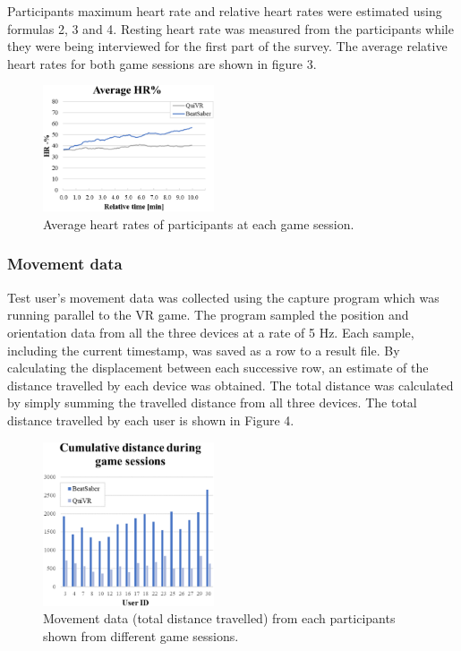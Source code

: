 \documentclass{sig-alternate-05-2015}
\begin{document}
Participants maximum heart rate and relative heart rates were estimated using 
formulas 2, 3 and 4. Resting heart rate was measured from the participants while 
they were being interviewed for the first part of the survey. The average relative 
heart rates for both game sessions are shown in figure 3.  

\begin{figure}
    \centering
    \includegraphics[width=0.45\textwidth]{heartrate}
    \caption
        {
            Average heart rates of participants at each game session.
        }
\end{figure}

\subsubsection{Movement data}

Test user’s movement data was collected using the capture program which was running 
parallel to the VR game. The program sampled the position and orientation data from 
all the three devices at a rate of 5 Hz. Each sample, including the current timestamp, 
was saved as a row to a result file. By calculating the displacement between each 
successive row, an estimate of the distance travelled by each device was obtained. 
The total distance was calculated by simply summing the travelled distance from all 
three devices. The total distance travelled by each user is shown in Figure 4. 

\begin{figure}
    \centering
    \includegraphics[width=0.45\textwidth]{motiondata}
    \caption
        {
            Movement data (total distance travelled) from each participants shown from different game sessions.
        }
\end{figure}
\end{document}
